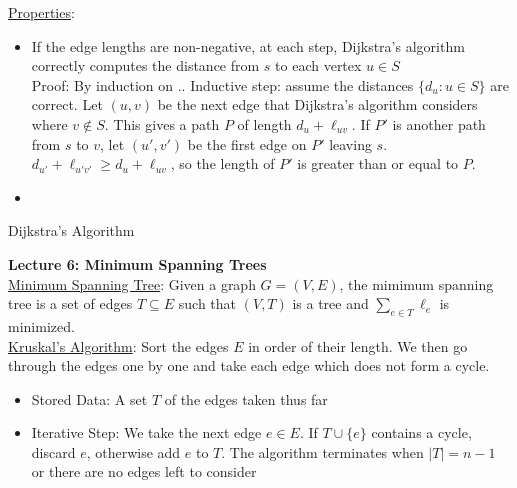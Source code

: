 \documentclass{article}
\begin{document}
\underline{Properties}: 
\begin{itemize}
    \item If the edge lengths are non-negative, at each step, Dijkstra's algorithm correctly computes the distance from $s$ to each vertex $u \in S$ \\
    Proof: By induction on .. Inductive step: assume the distances $\{d_u : u \in S\}$ are correct. Let $(u, v)$ be the next edge that Dijkstra's algorithm considers where $v \notin S$. This gives a path $P$ of length $d_u + \ell_{uv}$. If $P'$ is another path from $s$ to $v$, let $(u', v')$ be the first edge on $P'$ leaving $s$. $d_{u'} + \ell_{u'v'} \geq d_u + \ell_{uv}$, so the length of $P'$ is greater than or equal to $P$.
    \item 
\end{itemize}


\begin{algorithm}
\caption{Dijkstra's Algorithm}

\end{algorithm}

    


\textbf{Lecture 6: Minimum Spanning Trees} \\[1.0ex]
\underline{Minimum Spanning Tree}: Given a graph $G = (V, E)$, the mimimum spanning tree is a set of edges $T \subseteq E$ such that $(V, T)$ is a tree and $\sum_{e \in T} \ell_e$ is minimized.\\[1.0ex]
\underline{Kruskal's Algorithm}: Sort the edges $E$ in order of their length. We then go through the edges one by one and take each edge which does not form a cycle.
\begin{itemize}
    \item Stored Data: A set $T$ of the edges taken thus far 
    \item Iterative Step: We take the next edge $e \in E$. If $T \cup \{e\}$ contains a cycle, discard $e$, otherwise add $e$ to $T$. The algorithm terminates when $|T| = n - 1$ or there are no edges left to consider
\end{itemize}
\end{document}
